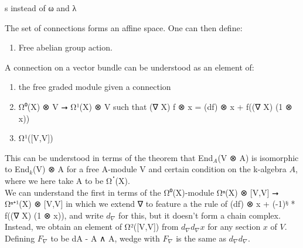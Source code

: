 \documentclass{book}
\theoremstyle{definition}
\begin{document}
s instead of ω and λ

The set of connections forms an affine space. One can then define:

\begin{enumerate}
\item Free abelian group action.
\end{enumerate}

A connection on a vector bundle can be understood as an element of:

\begin{enumerate}
\item the free graded module given a connection
\item Ω⁰(X) ⊗ V ⭢ Ω¹(X) ⊗ V such that (∇ X) f ⊗ x = (df) ⊗ x + f((∇ X) (1 ⊗ x))
\item Ω¹([V,V])
\end{enumerate}

This can be understood in terms of the theorem that End${}_{A}$(V ⊗ A) is isomorphic to End${}_{k}$(V) ⊗ A for a free A-module V and certain condition on the k-algebra $A$, where we here take A to be Ωॱ(X).\\

We can understand the first in terms of the Ω⁰(X)-module Ωⁿ(X) ⊗ [V,V] ⭢ Ωⁿ⁺¹(X) ⊗ [V,V] in which we extend ∇ to feature a the rule of (df) ⊗ x + (-1)ⁱʲ * f((∇ X) (1 ⊗ x)), and write $d_{∇}$ for this, but it doesn't form a chain complex. Instead, we obtain an element of Ω²([V,V]) from $d_{∇} d_{∇} x$ for any section $x$ of $V$. Defining $F_{∇}$ to be dA - A ∧ A, wedge with $F_{∇}$ is the same as $d_{∇} d_{∇}$.\\
\end{document}
